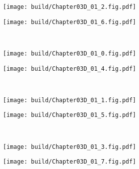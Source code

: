 \begin{Figure}[套筒式共源共栅放大器的特性]
    \begin{FigureSub}
        \texttt{[image: build/Chapter03D\_01\_2.fig.pdf]}
    \end{FigureSub} \hspace{0.3cm}
    \begin{FigureSub}
        \texttt{[image: build/Chapter03D\_01\_6.fig.pdf]}
    \end{FigureSub}\\ \vspace{0.5cm}
    \begin{FigureSub}
        \texttt{[image: build/Chapter03D\_01\_0.fig.pdf]}
    \end{FigureSub} \hspace{0.3cm}
    \begin{FigureSub}
        \texttt{[image: build/Chapter03D\_01\_4.fig.pdf]}
    \end{FigureSub}\\ \vspace{0.5cm}
    \begin{FigureSub}
        \texttt{[image: build/Chapter03D\_01\_1.fig.pdf]}
    \end{FigureSub} \hspace{0.15cm}
    \begin{FigureSub}
        \texttt{[image: build/Chapter03D\_01\_5.fig.pdf]}
    \end{FigureSub}\\ \vspace{0.5cm}
    \begin{FigureSub}
        \texttt{[image: build/Chapter03D\_01\_3.fig.pdf]}
    \end{FigureSub} \hspace{0.15cm}
    \begin{FigureSub}
        \texttt{[image: build/Chapter03D\_01\_7.fig.pdf]}
    \end{FigureSub}
\end{Figure}



